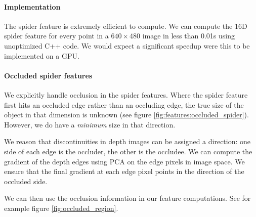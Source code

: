 \documentclass[10pt,twocolumn,letterpaper]{article}
\newcommand{\pixelidx}{\mathbf{s}}
\newcommand{\point}{\mathbf{p}}
\begin{document}
\paragraph{Implementation}
The spider feature is extremely efficient to compute.
We can compute the 16D spider feature for every point in a $640\times480$ image in less than 0.01s using unoptimized C++ code.
We would expect a significant speedup were this to be implemented on a GPU.


\paragraph{Occluded spider features}

We explicitly handle occlusion in the spider features. Where the spider feature first hits an occluded edge rather than an occluding edge, the true size of the object in that dimension is unknown (see figure \ref{fig:features:occluded_spider}).
However, we do have a \textit{minimum} size in that direction.

We reason that discontinuities in depth images can be assigned a direction: one side of each edge is the occluder, the other is the occludee. 
We can compute the gradient of the depth edges using PCA on the edge pixels in image space.
We ensure that the final gradient at each edge pixel points in the direction of the occluded side.

We can then use the occlusion information in our feature computations.
See for example figure \ref{fig:occluded_region}.



\end{document}
